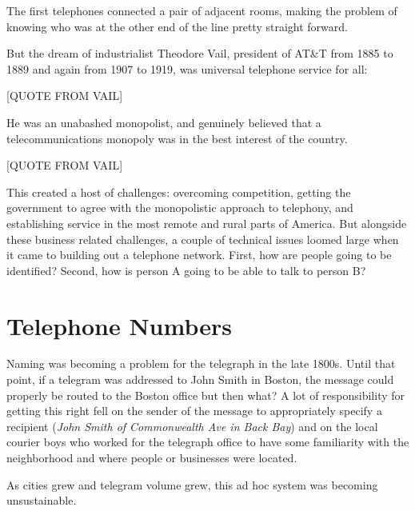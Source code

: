 \documentclass[UTF8]{book}
\begin{document}
\begin{CJK}{UTF8}{gbsn}
The first telephones connected a pair of adjacent rooms, making the problem of knowing who was at the other end of the line pretty straight forward.

But the dream of industrialist Theodore Vail, president of AT\&T from 1885 to 1889 and again from 1907 to 1919, was universal telephone service for all:

[QUOTE FROM VAIL]

He was an unabashed monopolist, and genuinely believed that a telecommunications monopoly was in the best interest of the country.

[QUOTE FROM VAIL]

This created a host of challenges: overcoming competition, getting the government to agree with the monopolistic approach to telephony, and establishing service in the most remote and rural parts of America. But alongside these business related challenges, a couple of technical issues loomed large when it came to building out a telephone network. First, how are people going to be identified? Second, how is person A going to be able to talk to person B?

\section{Telephone Numbers}

Naming was becoming a problem for the telegraph in the late 1800s. Until that point, if a telegram was addressed to John Smith in Boston, the message could properly be routed to the Boston office but then what? A lot of responsibility for getting this right fell on the sender of the message to appropriately specify a recipient (\emph{John Smith of Commonwealth Ave in Back Bay}) and on the local courier boys who worked for the telegraph office to have some familiarity with the neighborhood and where people or businesses were located.

As cities grew and telegram volume grew, this ad hoc system was becoming unsustainable.



\end{CJK}
\end{document}
